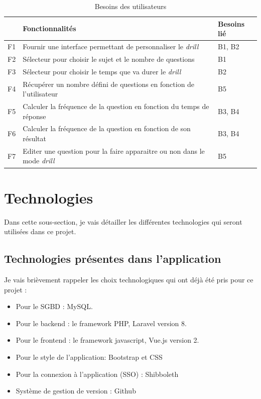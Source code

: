 \begin{table}[h]
    \begin{center}
        \caption{Besoins des utilisateurs \label{Besoins}}
        \begin{tabular}{|l|l|l|}
            \hline
            \textbf{} & \textbf{Fonctionnalités}                                                      & \textbf{Besoins lié} \\
            \hline
            F1        & Fournir une interface permettant de personnaliser le \emph{drill}             & B1, B2               \\
            \hline
            F2        & Sélecteur pour choisir le sujet et le nombre de questions                     & B1                   \\
            \hline
            F3        & Sélecteur pour choisir le temps que va durer le \emph{drill}                  & B2                   \\
            \hline
            F4        & Récupérer un nombre défini de questions en fonction de l'utilisateur          & B5                   \\
            \hline
            F5        & Calculer la fréquence de la question en fonction du temps de réponse          & B3, B4               \\
            \hline
            F6        & Calculer la fréquence de la question en fonction de son résultat              & B3, B4               \\
            \hline
            F7        & Editer une question pour la faire apparaitre ou non dans le mode \emph{drill} & B5                   \\
            \hline
        \end{tabular}
    \end{center}
\end{table}



\section{Technologies}
Dans cette sous-section, je vais détailler les différentes technologies qui seront utilisées dans ce projet.
\subsection{Technologies présentes dans l'application}
Je vais brièvement rappeler les choix technologiques qui ont déjà été pris pour ce projet :
\begin{itemize}
    \item Pour le SGBD : MySQL.
    \item Pour le backend : le framework PHP, Laravel version 8.
    \item Pour le frontend : le framework javascript, Vue.js version 2.
    \item Pour le style de l'application: Bootstrap et CSS
    \item Pour la connexion à l'application (SSO) : Shibboleth
    \item Système de gestion de version : Github
\end{itemize}

